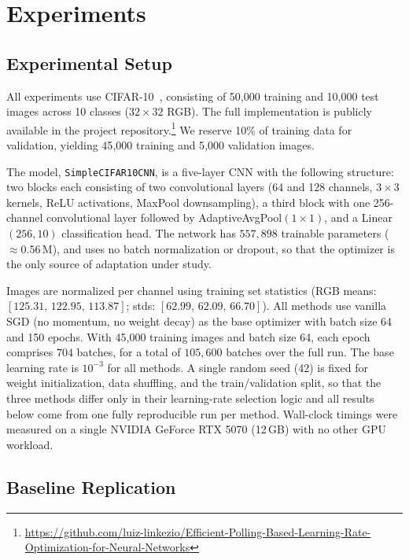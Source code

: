 \documentclass[conference]{IEEEtran}
\begin{document}
\section{Experiments}

\subsection{Experimental Setup}

All experiments use CIFAR-10~\cite{krizhevsky2009cifar}, consisting of 50{,}000 training and 10{,}000 test images across 10 classes ($32\!\times\!32$ RGB). The full implementation is publicly available in the project repository.\footnote{\url{https://github.com/luiz-linkezio/Efficient-Polling-Based-Learning-Rate-Optimization-for-Neural-Networks}} We reserve 10\% of training data for validation, yielding 45{,}000 training and 5{,}000 validation images.

The model, \texttt{SimpleCIFAR10CNN}, is a five-layer CNN with the following structure: two blocks each consisting of two convolutional layers (64 and 128 channels, $3\!\times\!3$ kernels, ReLU activations, MaxPool downsampling), a third block with one 256-channel convolutional layer followed by AdaptiveAvgPool$(1\!\times\!1)$, and a Linear$(256, 10)$ classification head. The network has $557{,}898$ trainable parameters ($\approx 0.56$\,M), and uses no batch normalization or dropout, so that the optimizer is the only source of adaptation under study.

Images are normalized per channel using training set statistics (RGB means: $[125.31,\, 122.95,\, 113.87]$; stds: $[62.99,\, 62.09,\, 66.70]$). All methods use vanilla SGD (no momentum, no weight decay) as the base optimizer with batch size 64 and 150 epochs. With 45{,}000 training images and batch size 64, each epoch comprises $704$ batches, for a total of $105{,}600$ batches over the full run. The base learning rate is $10^{-3}$ for all methods. A single random seed (42) is fixed for weight initialization, data shuffling, and the train/validation split, so that the three methods differ only in their learning-rate selection logic and all results below come from one fully reproducible run per method. Wall-clock timings were measured on a single NVIDIA GeForce RTX 5070 (12\,GB) with no other GPU workload.

\subsection{Baseline Replication}
\end{document}
